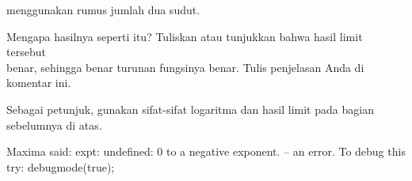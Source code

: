 \documentclass[a4paper,10pt]{article}
\begin{document}
\begin{eulernotebook}
\begin{eulercomment}
\begin{eulercomment}
\begin{eulercomment}
\begin{eulercomment}
\begin{eulercomment}
\begin{eulercomment}
\begin{eulercomment}
\begin{eulercomment}
\begin{eulercomment}
\begin{eulercomment}
\begin{eulercomment}
\begin{eulercomment}
\begin{eulercomment}
\begin{eulercomment}
\begin{eulercomment}
\begin{eulercomment}
\begin{eulercomment}
\begin{eulercomment}
\begin{eulercomment}
\begin{eulercomment}
\begin{eulercomment}
\begin{eulercomment}
\begin{eulercomment}
\begin{eulercomment}
\begin{eulercomment}
\begin{eulercomment}
\begin{eulercomment}
\begin{eulercomment}
\begin{eulercomment}
menggunakan rumus jumlah
dua sudut.
\end{eulercomment}
\begin{eulercomment}
Mengapa hasilnya seperti itu? Tuliskan atau tunjukkan bahwa hasil
limit tersebut\\
benar, sehingga benar turunan fungsinya benar.  Tulis penjelasan Anda
di komentar ini.

Sebagai petunjuk, gunakan sifat-sifat logaritma dan hasil limit pada
bagian sebelumnya di atas.
\end{eulercomment}
\begin{euleroutput}
  Maxima said:
  expt: undefined: 0 to a negative exponent.
   -- an error. To debug this try: debugmode(true);
  

\end{euleroutput}
\end{eulercomment}
\end{eulercomment}
\end{eulercomment}
\end{eulercomment}
\end{eulercomment}
\end{eulercomment}
\end{eulercomment}
\end{eulercomment}
\end{eulercomment}
\end{eulercomment}
\end{eulercomment}
\end{eulercomment}
\end{eulercomment}
\end{eulercomment}
\end{eulercomment}
\end{eulercomment}
\end{eulercomment}
\end{eulercomment}
\end{eulercomment}
\end{eulercomment}
\end{eulercomment}
\end{eulercomment}
\end{eulercomment}
\end{eulercomment}
\end{eulercomment}
\end{eulercomment}
\end{eulercomment}
\end{eulercomment}
\end{eulernotebook}
\end{document}
